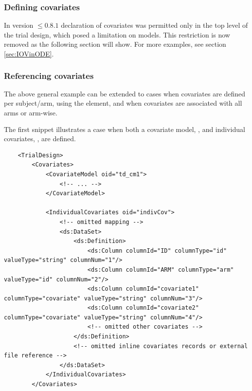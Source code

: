 \subsubsection{Defining covariates}
\label{subsubsec:defCovariates}
In version $\le 0.8.1$ declaration of covariates was permitted only in the 
top level of the trial design, which posed a limitation on models. 
This restriction is now removed as the following section will show.
For more examples, see section \ref{sec:IOVinODE}.


\subsubsection{Referencing covariates}
The above general example can be extended to cases when covariates are defined
per subject/arm, using the  element, and when covariates
are associated with all arms or arm-wise.

The first snippet illustrates a case when both a covariate model, , and individual
covariates, , are defined.

\lstset{language=XML}
\begin{lstlisting}
    <TrialDesign>
        <Covariates>
            <CovariateModel oid="td_cm1">
                <!-- ... -->
            </CovariateModel>
            
            <IndividualCovariates oid="indivCov">
                <!-- omitted mapping -->
                <ds:DataSet>
                    <ds:Definition>
                        <ds:Column columnId="ID" columnType="id" valueType="string" columnNum="1"/>
                        <ds:Column columnId="ARM" columnType="arm" valueType="id" columnNum="2"/>
                        <ds:Column columnId="covariate1" columnType="covariate" valueType="string" columnNum="3"/>
                        <ds:Column columnId="covariate2" columnType="covariate" valueType="string" columnNum="4"/>
                        <!-- omitted other covariates -->
                    </ds:Definition>
                    <!-- omitted inline covariates records or external file reference -->
                </ds:DataSet>
            </IndividualCovariates>
        </Covariates>
\end{lstlisting}

